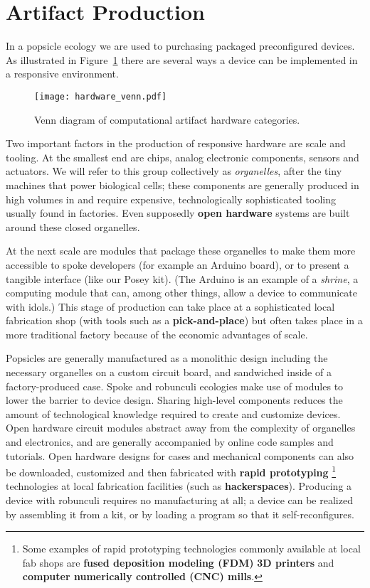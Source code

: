 \section{Artifact Production}
\label{sec:production}
%
In a popsicle ecology we are used to purchasing packaged preconfigured devices. As illustrated in Figure~\ref{fig:hardware_venn} there are several ways a device can be implemented in a responsive environment. 

\begin{figure}[b!]
  \centering
    \texttt{[image: hardware\_venn.pdf]}
  \caption{Venn diagram of computational artifact hardware categories.}
  \label{fig:hardware_venn}
\end{figure}

Two important factors in the production of responsive hardware are scale and tooling. 
At the smallest end are chips, analog electronic components, sensors and actuators. 
We will refer to this group collectively as \emph{organelles}, after the tiny machines that power biological cells; these components are generally produced in high volumes in and require expensive, technologically sophisticated tooling usually found in factories. 
Even supposedly \textbf{open hardware} systems are built around these closed organelles. 

At the next scale are modules that package these organelles to make them more accessible to spoke developers (for example an Arduino board), or to present a tangible interface (like our Posey kit). 
(The Arduino is an example of a \emph{shrine}, a computing module that can, among other things, allow a device to communicate with idols.) 
This stage of production can take place at a sophisticated local fabrication shop (with tools such as a \textbf{pick{}-and{}-place}) but often takes place in a more traditional factory because of the economic advantages of scale.

Popsicles are generally manufactured as a monolithic design including the necessary organelles on a custom circuit board, and sandwiched inside of a factory{}-produced case. 
Spoke and robunculi ecologies make use of modules to lower the barrier to device design. 
Sharing high{}-level components reduces the amount of technological knowledge required to create and customize devices.
Open hardware circuit modules abstract away from the complexity of organelles and electronics, and are generally accompanied by online code samples and tutorials. 
Open hardware designs for cases and mechanical components can also be downloaded, customized and then fabricated with \textbf{rapid prototyping}%
\footnote{Some examples of rapid prototyping technologies commonly available at local fab shops are \textbf{fused deposition modeling (FDM)} \textbf{3D printers} and \textbf{computer numerically controlled (CNC) mills}.}
technologies at local fabrication facilities (such as \textbf{hackerspaces}).
Producing a device with robunculi requires no manufacturing at all; a device can be realized by assembling it from a kit, or by loading a program so that it self{}-reconfigures.

